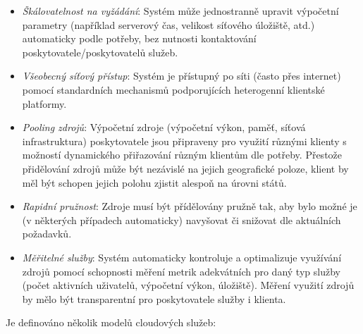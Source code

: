 \begin{itemize}
  \item{\textit{Škálovatelnost na vyžádání}}: Systém může jednostranně upravit výpočetní parametry (například serverový čas, velikost síťového úložiště, atd.) automaticky podle potřeby, bez nutnosti kontaktování poskytovatele/poskytovatelů služeb.
  \item{\textit{Všeobecný síťový přístup}}: Systém je přístupný po síti (často přes internet) pomocí standardních mechanismů podporujících heterogenní klientské platformy.
  \item{\textit{Pooling zdrojů}}: Výpočetní zdroje (výpočetní výkon, paměť, síťová infrastruktura) poskytovatele jsou připraveny pro využití různými klienty s možností dynamického přiřazování různým klientům dle potřeby. Přestože přidělování zdrojů může být nezávislé na jejich geografické poloze, klient by měl být schopen jejich polohu zjistit alespoň na úrovni států.
  \item{\textit{Rapidní pružnost}}: Zdroje musí být přídělovány pružně tak, aby bylo možné je (v některých případech automaticky) navyšovat či snižovat dle aktuálních požadavků.
  \item{\textit{Měřitelné služby}}: Systém automaticky kontroluje a optimalizuje využívání zdrojů pomocí schopnosti měření metrik adekvátních pro daný typ služby (počet aktivních uživatelů, výpočetní výkon, úložiště). Měření využití zdrojů by mělo být transparentní pro poskytovatele služby i klienta.
\end{itemize}

Je definováno několik modelů cloudových služeb:

